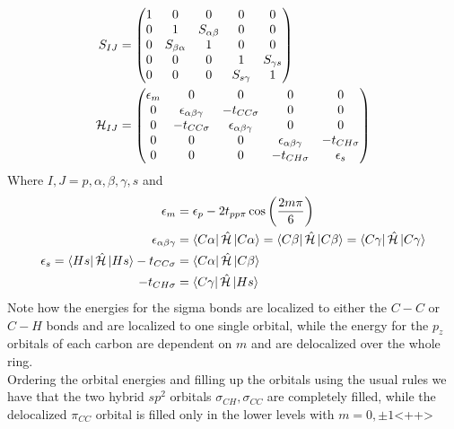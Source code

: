 \documentclass[../qm.tex]{subfiles}
\begin{document}
	\begin{equation}
		\begin{aligned}
		S_{IJ}&=\begin{pmatrix}
			1&0&0&0&0\\
			0&1&S_{\alpha\beta}&0&0\\
			0&S_{\beta\alpha}&1&0&0\\
			0&0&0&1&S_{\gamma s}\\
			0&0&0&S_{s\gamma}&1
			\end{pmatrix}\\
		\mathcal{H}_{IJ}&=\begin{pmatrix}
			\epsilon_m&0&0&0&0\\
			0&\epsilon_{\alpha\beta\gamma}&-t_{CC\sigma}&0&0\\
			0&-t_{CC\sigma}&\epsilon_{\alpha\beta\gamma}&0&0\\
			0&0&0&\epsilon_{\alpha\beta\gamma}&-t_{CH\sigma}\\
			0&0&0&-t_{CH\sigma}&\epsilon_{s}
		\end{pmatrix}
		\end{aligned}
		\label{eq:benzenematrix}
	\end{equation}
	Where $I,J=p,\alpha,\beta,\gamma,s$ and
	\begin{equation}
		\begin{aligned}
			\epsilon_m&=\epsilon_p-2t_{pp\pi}\cos\left( \frac{2m\pi}{6} \right)\\
			\epsilon_{\alpha\beta\gamma}&=\bra{C\alpha}\hat{\mathcal{H}}\ket{C\alpha}=\bra{C\beta}\hat{\mathcal{H}}\ket{C\beta}=\bra{C\gamma}\hat{\mathcal{H}}\ket{C\gamma}\\
			\epsilon_s=\bra{Hs}\hat{\mathcal{H}}\ket{Hs}
			-t_{CC\sigma}&=\bra{C\alpha}\hat{\mathcal{H}}\ket{C\beta}\\
			-t_{CH\sigma}&=\bra{C\gamma}\hat{\mathcal{H}}\ket{Hs}
		\end{aligned}
		\label{eq:benzmatdef}
	\end{equation}
	Note how the energies for the sigma bonds are localized to either the $C-C$ or $C-H$ bonds and are localized to one single orbital, while the energy for the $p_z$ orbitals of each carbon are dependent on $m$ and are delocalized over the whole ring.\\
	Ordering the orbital energies and filling up the orbitals using the usual rules we have that the two hybrid $sp^2$ orbitals $\sigma_{CH},\sigma_{CC}$ are completely filled, while the delocalized $\pi_{CC}$ orbital is filled only in the lower levels with $m=0,\pm1$<++>
\end{document}
